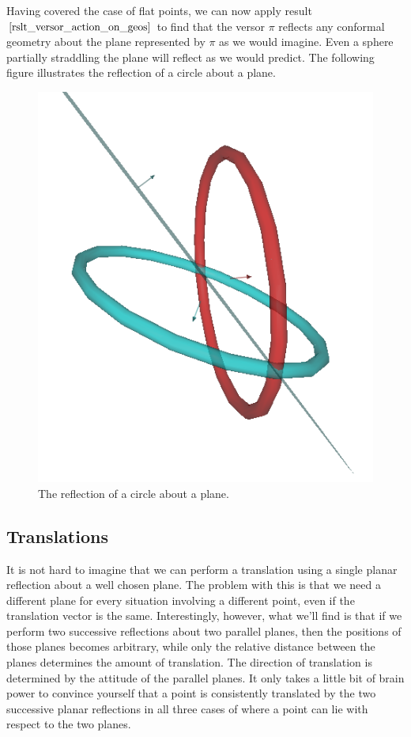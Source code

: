 \documentclass[12pt]{article}
\begin{document}
Having covered the case of flat points, we can now apply result $\eqref{rslt_versor_action_on_geos}$
to find that the versor $\pi$ reflects any conformal geometry about the plane represented by
$\pi$ as we would imagine.  Even a sphere partially straddling the plane will reflect as we would predict.
The following figure illustrates the reflection of a circle about a plane.
\begin{figure}[H]
\centering
\includegraphics[scale=0.3]{ReflectionOfCircleAboutPlaneFigure}
\caption{The reflection of a circle about a plane.}
\end{figure}

\subsection{Translations}

It is not hard to imagine that we can perform a translation
using a single planar reflection about a well chosen plane.
The problem with this is that we need a different plane for
every situation involving a different point, even if the translation
vector is the same.  Interestingly, however, what we'll find is that
if we perform two successive reflections about two parallel planes, then
the positions of those planes becomes arbitrary, while only the relative
distance between the planes determines the amount of translation.
The direction of translation is determined by the attitude of the parallel planes.
It only takes a little bit of brain power to convince yourself that a point is consistently
translated by the two successive planar reflections in all three cases of where
a point can lie with respect to the two planes.
\end{document}
